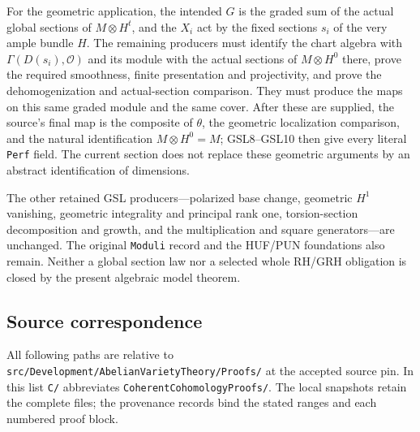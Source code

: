 For the geometric application, the intended $G$ is the graded sum of
the actual global sections of $M\otimes H^t$, and the $X_i$ act by
the fixed sections $s_i$ of the very ample bundle $H$.
The remaining producers must identify the chart algebra with
$\Gamma(D(s_i),\mathcal O)$ and its module with the actual
sections of $M\otimes H^0$ there, prove the required smoothness,
finite presentation and projectivity, and prove the dehomogenization
and actual-section comparison.  They must produce the maps on this
same graded module and the same cover.  After these are supplied,
the source's final map is the composite of $\theta$, the geometric
localization comparison, and the natural identification
$M\otimes H^0=M$; GSL8--GSL10 then give every literal
\texttt{Perf} field.  The current section does not replace these
geometric arguments by an abstract identification of dimensions.

The other retained GSL producers---polarized base change, geometric
$H^1$ vanishing, geometric integrality and principal rank one,
torsion-section decomposition and growth, and the multiplication
and square generators---are unchanged.  The original \texttt{Moduli}
record and the HUF/PUN foundations also remain.  Neither a global
section law nor a selected whole RH/GRH obligation is closed by the
present algebraic model theorem.

\subsection{Source correspondence}

All following paths are relative to
\texttt{src/Development/AbelianVarietyTheory/Proofs/} at the
accepted source pin.  In this list \texttt{C/} abbreviates
\texttt{CoherentCohomologyProofs/}.  The local snapshots retain the
complete files; the provenance records bind the stated ranges and
each numbered proof block.

